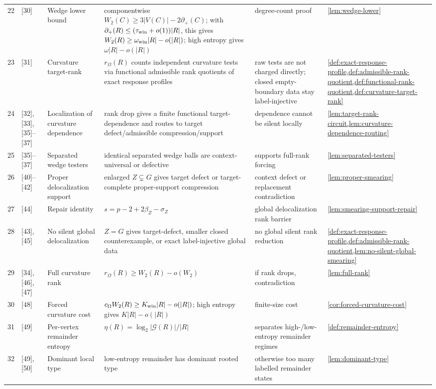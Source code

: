 \documentclass[11pt]{article}
\newcommand{\defp}{\partial_+}
\begin{document}
{\begin{longtable}{C{0.04\textwidth} L{0.13\textwidth} L{0.17\textwidth} L{0.25\textwidth} L{0.21\textwidth} L{0.12\textwidth}}
22 & [30] & Wedge lower bound & componentwise \(W_2(C)\ge3|V(C)|-2\defp(C)\); with \(\defp(R)\le(\tau_{\rm win}+o(1))|R|\), this gives \(W_2(R)\ge\omega_{\rm win}|R|-o(|R|)\); high entropy gives \(\omega|R|-o(|R|)\) & degree-count proof & \cref{lem:wedge-lower} \\
23 & [31] & Curvature target-rank & $r_\Omega(R)$ counts independent curvature tests via functional admissible rank quotients of exact response profiles & raw tests are not charged directly; closed empty-boundary data stay label-injective & \cref{def:exact-response-profile,def:admissible-rank-quotient,def:functional-rank-quotient,def:curvature-target-rank} \\
24 & [32], [33], [35]--[37] & Localization of curvature dependence & rank drop gives a finite functional target-dependence and routes to target defect/admissible compression/support & dependence cannot be silent locally & \cref{lem:target-rank-circuit,lem:curvature-dependence-routing} \\
25 & [35]--[37] & Separated wedge testers & identical separated wedge balls are context-universal or defective & supports full-rank forcing & \cref{lem:separated-testers} \\
26 & [40]--[42] & Proper delocalization support & enlarged $Z\subsetneq G$ gives target defect or target-complete proper-support compression & context defect or replacement contradiction & \cref{lem:proper-smearing} \\
27 & [44] & Repair identity & $s=p-2+2\beta_Z-\sigma_Z$ & global delocalization rank barrier & \cref{lem:smearing-support-repair} \\
28 & [43], [45] & No silent global delocalization & $Z=G$ gives target-defect, smaller closed counterexample, or exact label-injective global data & no global silent rank reduction & \cref{def:exact-response-profile,def:admissible-rank-quotient,lem:no-silent-global-smearing} \\
29 & [34], [46], [47] & Full curvature rank & $r_\Omega(R)\ge W_2(R)-o(W_2)$ & if rank drops, contradiction & \cref{lem:full-rank} \\
30 & [48] & Forced curvature cost & $c_\Omega W_2(R)\ge K_{\rm win}|R|-o(|R|)$; high entropy gives $K|R|-o(|R|)$ & finite-size cost & \cref{cor:forced-curvature-cost} \\
31 & [49] & Per-vertex remainder entropy & $\eta(R)=\log_2|\mathcal G(R)|/|R|$ & separates high-/low-entropy remainder regimes & \cref{def:remainder-entropy} \\
32 & [49], [50] & Dominant local type & low-entropy remainder has dominant rooted type & otherwise too many labelled remainder states & \cref{lem:dominant-type} \\

\end{longtable}}
\end{document}
